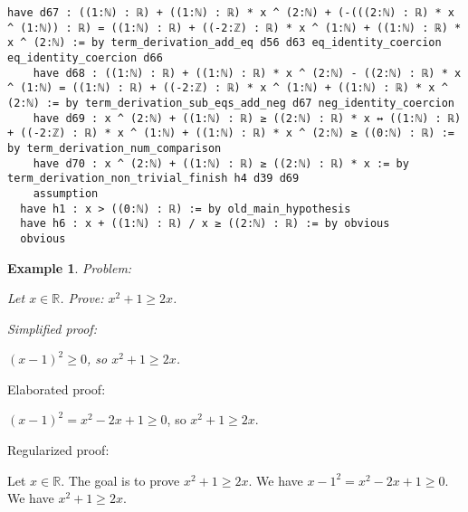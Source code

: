 \documentclass{article}
\newtheorem{example}{Example}
\begin{document}
\begin{tcolorbox}[colback=white!10, width=\linewidth]
\begin{lstlisting}[language=Lean4]
    have d67 : ((1:ℕ) : ℝ) + ((1:ℕ) : ℝ) * x ^ (2:ℕ) + (-(((2:ℕ) : ℝ) * x ^ (1:ℕ)) : ℝ) = ((1:ℕ) : ℝ) + ((-2:ℤ) : ℝ) * x ^ (1:ℕ) + ((1:ℕ) : ℝ) * x ^ (2:ℕ) := by term_derivation_add_eq d56 d63 eq_identity_coercion eq_identity_coercion d66
    have d68 : ((1:ℕ) : ℝ) + ((1:ℕ) : ℝ) * x ^ (2:ℕ) - ((2:ℕ) : ℝ) * x ^ (1:ℕ) = ((1:ℕ) : ℝ) + ((-2:ℤ) : ℝ) * x ^ (1:ℕ) + ((1:ℕ) : ℝ) * x ^ (2:ℕ) := by term_derivation_sub_eqs_add_neg d67 neg_identity_coercion
    have d69 : x ^ (2:ℕ) + ((1:ℕ) : ℝ) ≥ ((2:ℕ) : ℝ) * x ↔ ((1:ℕ) : ℝ) + ((-2:ℤ) : ℝ) * x ^ (1:ℕ) + ((1:ℕ) : ℝ) * x ^ (2:ℕ) ≥ ((0:ℕ) : ℝ) := by term_derivation_num_comparison
    have d70 : x ^ (2:ℕ) + ((1:ℕ) : ℝ) ≥ ((2:ℕ) : ℝ) * x := by term_derivation_non_trivial_finish h4 d39 d69
    assumption
  have h1 : x > ((0:ℕ) : ℝ) := by old_main_hypothesis
  have h6 : x + ((1:ℕ) : ℝ) / x ≥ ((2:ℕ) : ℝ) := by obvious
  obvious

\end{lstlisting}
\end{tcolorbox}


\begin{example}
Problem:
\begin{tcolorbox}[colback=yellow!10, width=\linewidth]
Let $x\in\mathbb{R}$. Prove: $x^2 + 1\ge 2x$.
\end{tcolorbox}

Simplified proof:
\begin{tcolorbox}[colback=blue!10, width=\linewidth]
$(x-1)^2 \ge 0$, so $x^2 + 1 \ge 2x$.
\end{tcolorbox}
\end{example}

Elaborated proof:
\begin{tcolorbox}[colback=green!10, width=\linewidth]
$(x-1)^2 = x^2 - 2x + 1 \ge 0$, so $x^2 + 1 \ge 2x$.
\end{tcolorbox}

Regularized proof:
\begin{tcolorbox}[colback=red!10, width=\linewidth]
Let $x\in\mathbb{R}$.
The goal is to prove $x^2 + 1 \ge 2x$.
We have ${{x-1}}^2 = x^2 - 2x + 1 \ge 0$.
We have $x^2 + 1 \ge 2x$.
\end{tcolorbox}
\end{document}
